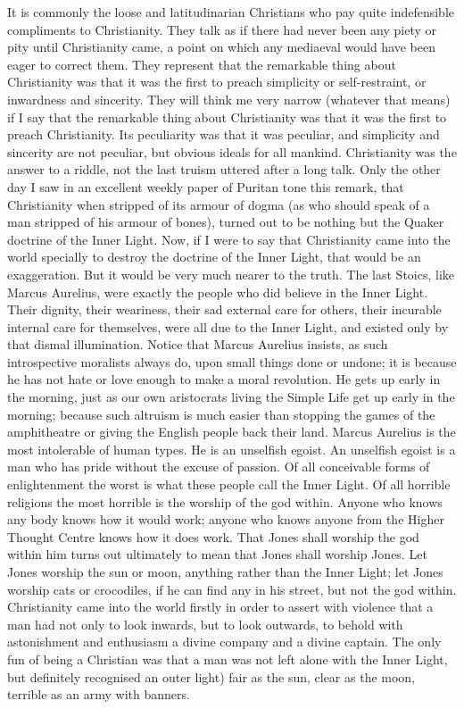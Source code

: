 \documentclass{book}
\begin{document}
It is commonly the loose and latitudinarian Christians who pay quite indefensible compliments to Christianity. They talk as if there had never been any piety or pity until Christianity came, a point on which any mediaeval would have been eager to correct them. They represent that the remarkable thing about Christianity was that it was the first to preach simplicity or self-restraint, or inwardness and sincerity. They will think me very narrow (whatever that means) if I say that the remarkable thing about Christianity was that it was the first to preach Christianity. Its peculiarity was that it was peculiar, and simplicity and sincerity are not peculiar, but obvious ideals for all mankind. Christianity was the answer to a riddle, not the last truism uttered after a long talk. Only the other day I saw in an excellent weekly paper of Puritan tone this remark, that Christianity when stripped of its armour of dogma (as who should speak of a man stripped of his armour of bones), turned out to be nothing but the Quaker doctrine of the Inner Light. Now, if I were to say that Christianity came into the world specially to destroy the doctrine of the Inner Light, that would be an exaggeration. But it would be very much nearer to the truth. The last Stoics, like Marcus Aurelius, were exactly the people who did believe in the Inner Light. Their dignity, their weariness, their sad external care for others, their incurable internal care for themselves, were all due to the Inner Light, and existed only by that dismal illumination. Notice that Marcus Aurelius insists, as such introspective moralists always do, upon small things done or undone; it is because he has not hate or love enough to make a moral revolution. He gets up early in the morning, just as our own aristocrats living the Simple Life get up early in the morning; because such altruism is much easier than stopping the games of the amphitheatre or giving the English people back their land. Marcus Aurelius is the most intolerable of human types. He is an unselfish egoist. An unselfish egoist is a man who has pride without the excuse of passion. Of all conceivable forms of enlightenment the worst is what these people call the Inner Light. Of all horrible religions the most horrible is the worship of the god within. Anyone who knows any body knows how it would work; anyone who knows anyone from the Higher Thought Centre knows how it does work. That Jones shall worship the god within him turns out ultimately to mean that Jones shall worship Jones. Let Jones worship the sun or moon, anything rather than the Inner Light; let Jones worship cats or crocodiles, if he can find any in his street, but not the god within. Christianity came into the world firstly in order to assert with violence that a man had not only to look inwards, but to look outwards, to behold with astonishment and enthusiasm a divine company and a divine captain. The only fun of being a Christian was that a man was not left alone with the Inner Light, but definitely recognised an outer light) fair as the sun, clear as the moon, terrible as an army with banners.
\end{document}
